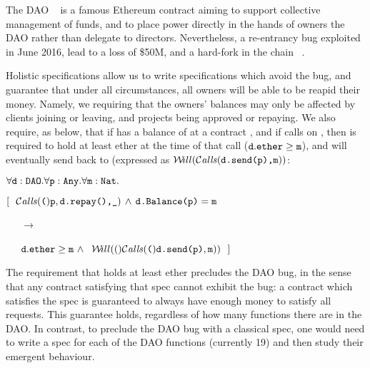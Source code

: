 The DAO ~\cite{DAO}  is a famous Ethereum contract  aiming  to support
collective management of funds,  and to place power directly in the hands of owners the DAO 
rather than delegate to directors. 
Nevertheless, a re-entrancy bug   exploited in June 2016, lead  to a loss of   \$50M, and
a hard-fork in the  chain ~\cite{DaoBug}. 
 
Holistic specifications allow us to write specifications which avoid the bug, and guarantee that under all circumstances,
all owners will be able to be reapid their money.
Namely, we
requiring that  %
 the owners'  balances may only be affected by clients joining or leaving, and
projects being approved or repaying.
We also require,
as below, that %
%
if    has a balance of  at a  contract ,
and if  calls  on , then  
  is required to hold at least  ether at the time of that call (${\mbox{\tt{d}}}.{\mbox{\tt{ether}}}\geq {\mbox{\tt{m}}}$), and will eventually send  back to  (expressed as ${{\mathcal W}\!ill}({\mathcal{C}}\textrm{\textit{alls}}({\mbox{\tt{{\mbox{\tt{d.send(p)}}},m}}}))$:

\vspace{.07cm}

\noindent  
\strut \hspace{0.5cm} $\forall {\mbox{\tt{d}}}:{\mbox{\tt{DAO}}}.\forall {\mbox{\tt{p}}}:{\mbox{\tt{Any}}}.\forall{\mbox{\tt{m}}}:{\mbox{\tt{Nat}}}.$\\
\strut \hspace{0.5cm} $[\ \  {\mathcal{C}}\textrm{\textit{alls}}({\mbox{\tt{(}}}){\mbox{\tt{p}}},{\mbox{\tt{d.repay(),\_}}})\, \wedge\, {\mbox{\tt{d.Balance(p)}}}={\mbox{\tt{m}}} $\\ 
\strut \hspace{0.5cm} \ \ \ $\longrightarrow$\\
\strut \hspace{0.5cm} \ \ \ $\prg{d}.\prg{ether}\geq \prg{m}\ \wedge$ $\ \Future(\Calls(\prg{d.send(p)},\prg{m}))\ \ ] $ 

\noindent
The requirement that  holds at least  ether precludes the DAO bug,
in the sense that  any contract satisfying that spec cannot exhibit  the  bug:   a contract
which satisfies the spec  is guaranteed to always have enough money to satisfy all  requests.
This guarantee  holds, regardless of how many functions there are in the DAO.
In contrast, to preclude the DAO  bug with a classical spec, one would need to write a spec for each of the 
DAO functions (currently 19) and then study their emergent  behaviour. 


